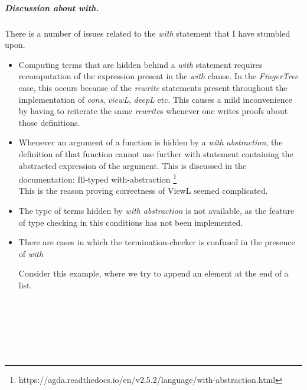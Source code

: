 \documentclass[12pt,twoside,notitlepage]{report}
\begin{document}
\subparagraph{Discussion about \textit{with}.}There is a number of issues related to the \textit{with} statement that I have stumbled upon.

\begin{itemize}
\item Computing terms that are hidden behind a \textit{with} statement requires recomputation of the expression present in the \textit{with} clause. In the \textit{FingerTree} case, this occurs because of the \textit{rewrite} statements present throughout the implementation of \textit{cons}, \textit{viewL}, \textit{deepL} etc. This causes a mild inconvenience by having to reiterate the same \textit{rewrite}s whenever one writes proofs about those definitions.

\item Whenever an argument of a function is hidden by a \textit{with abstraction}, the definition of that function cannot use further with statement containing the abstracted expression of the argument. This is discussed in the documentation: Ill-typed with-abstraction \footnote{https://agda.readthedocs.io/en/v2.5.2/language/with-abstraction.html} \\
This is the reason proving correctness of ViewL seemed complicated.

\item The type of terms hidden by \textit{with abstraction} is not available, as the feature of type checking in this conditions has not been implemented.

\item There are cases in which the termination-checker is confused in the presence of \textit{with}

Consider this example, where we try to append an element at the end of a list.

\begin{code}
\\
\> \AgdaSymbol{:}  \AgdaSymbol{\{}\AgdaSymbol{\}}        \<%
\\
\>    \<%
\\
\>   \AgdaSymbol{|} \AgdaInductiveConstructor{[]} \AgdaSymbol{=}   \AgdaInductiveConstructor{[]}\<%
\\
\>   \AgdaSymbol{|}    \AgdaSymbol{=}   \AgdaSymbol{(}  \AgdaSymbol{)}\<%
\\
\end{code} 

\end{itemize}
\end{document}
